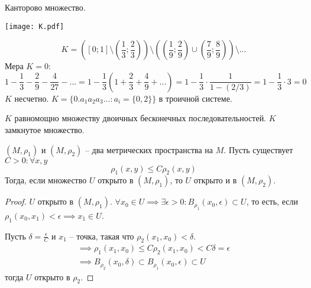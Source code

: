 \documentclass[main]{subfiles}
\begin{document}
\begin{example}
    Канторово множество.

    \begin{center}
        \texttt{[image: K.pdf]}
    \end{center}

    \[K = \left( \left[0;1\right]
        \setminus \left(\frac{1}{3}; \frac{2}{3}\right) \right)
        \setminus \left( \left(\frac{1}{9}; \frac{2}{9}\right)
        \cup \left(\frac{7}{9}; \frac{8}{9}\right) \right)
        \setminus ...\]
    Мера $K = 0$:
    \[1 - \frac{1}{3} - \frac{2}{9} - \frac{4}{27} - ... =
        1 - \frac{1}{3} \left(1 + \frac{2}{3} + \frac{4}{9} + ...\right) =
        1 - \frac{1}{3} \cdot \frac{1}{1- (2/3)} =
        1 - \frac{1}{3} \cdot 3 = 0\]
    $K$ несчетно. $K = \{0.a_1 a_2 a_3 ...: a_i = \{0, 2\}\}$ в троичной системе.

    $K$ равномощно множеству двоичных бесконечных последовательностей.
    $K$ замкнутое множество.
\end{example}

\begin{theorem}
    $(M, \rho_1)$ и $(M, \rho_2)$ -- два метрических пространства на $M$.
    Пусть существует $C > 0: \forall x,y$
    \[\rho_1 (x,y) \le C \rho_2(x,y)\]
    Тогда, если множество $U$ открыто в $(M, \rho_1)$,
    то $U$ открыто и в $(M, \rho_2)$.
\end{theorem}
\begin{proof}
    $U$ открыто в $(M, \rho_1)$.
    $\forall x_0 \in U \implies \exists \epsilon > 0: B_{\rho_1} (x_0, \epsilon) \subset U$,
    то есть, если $\rho_1 (x_0, x_1) < \epsilon \implies x_1 \in U$.

    Пусть $\delta = \frac{\epsilon}{C}$ и $x_1$ -- точка, такая что $\rho_2 (x_1, x_0) < \delta$.
    \begin{gather*}
        \implies \rho_1 (x_1, x_0) \le C \rho_2 (x_1, x_0) < C\delta = \epsilon\\
        \implies B_{\rho_2}(x_0, \delta) \subset B_{\rho_1}(x_0, \epsilon) \subset U
    \end{gather*}
    тогда $U$ открыто в $\rho_2$.
\end{proof}
\end{document}
